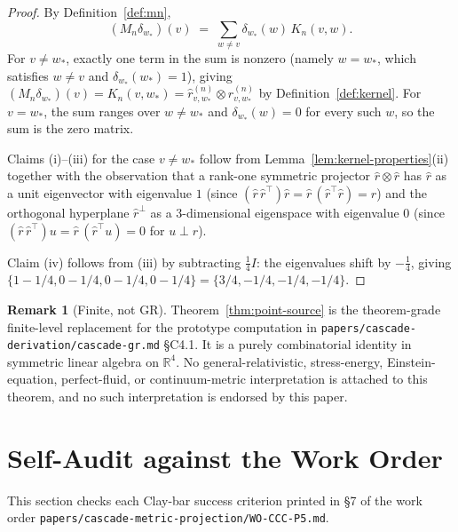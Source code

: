 \documentclass[11pt, a4paper]{amsart}
\theoremstyle{definition}
\newtheorem{remark}[theorem]{Remark}
\newcommand{\R}{\mathbb{R}}
\begin{document}
\begin{proof}
By Definition~\ref{def:mn},
\[
  (M_n \delta_{w_\ast})(v)
    \;=\; \sum_{w \neq v} \delta_{w_\ast}(w)\,K_n(v, w).
\]
For $v \neq w_\ast$, exactly one term in the sum is nonzero
(namely $w = w_\ast$, which satisfies $w \neq v$ and
$\delta_{w_\ast}(w_\ast) = 1$), giving $(M_n \delta_{w_\ast})(v)
= K_n(v, w_\ast) = \hat r_{v, w_\ast}^{(n)} \otimes
\hat r_{v, w_\ast}^{(n)}$ by Definition~\ref{def:kernel}. For
$v = w_\ast$, the sum ranges over $w \neq w_\ast$ and
$\delta_{w_\ast}(w) = 0$ for every such $w$, so the sum is the
zero matrix.

Claims (i)--(iii) for the case $v \neq w_\ast$ follow from
Lemma~\ref{lem:kernel-properties}(ii) together with the
observation that a rank-one symmetric projector $\hat r \otimes
\hat r$ has $\hat r$ as a unit eigenvector with eigenvalue $1$
(since $(\hat r\,\hat r^\top)\hat r = \hat r\,(\hat r^\top
\hat r) = \hat r$) and the orthogonal hyperplane
$\hat r^\perp$ as a $3$-dimensional eigenspace with eigenvalue
$0$ (since $(\hat r\,\hat r^\top)u = \hat r\,(\hat r^\top u) = 0$
for $u \perp \hat r$).

Claim (iv) follows from (iii) by subtracting $\tfrac{1}{4}I$:
the eigenvalues shift by $-\tfrac{1}{4}$, giving
$\{1 - 1/4, 0 - 1/4, 0 - 1/4, 0 - 1/4\} = \{3/4, -1/4, -1/4,
-1/4\}$.
\end{proof}

\begin{remark}[Finite, not GR]
\label{rmk:not-gr}
Theorem~\ref{thm:point-source} is the theorem-grade finite-level
replacement for the prototype computation in
\texttt{papers/cascade-derivation/cascade-gr.md} \S C4.1. It is a
purely combinatorial identity in symmetric linear algebra on
$\R^4$. No general-relativistic, stress-energy, Einstein-equation,
perfect-fluid, or continuum-metric interpretation is attached to
this theorem, and no such interpretation is endorsed by this
paper.
\end{remark}

\section{Self-Audit against the Work Order}
\label{sec:audit}

This section checks each Clay-bar success criterion printed in
\S 7 of the work order
\texttt{papers/cascade-metric-projection/WO-CCC-P5.md}.
\end{document}
